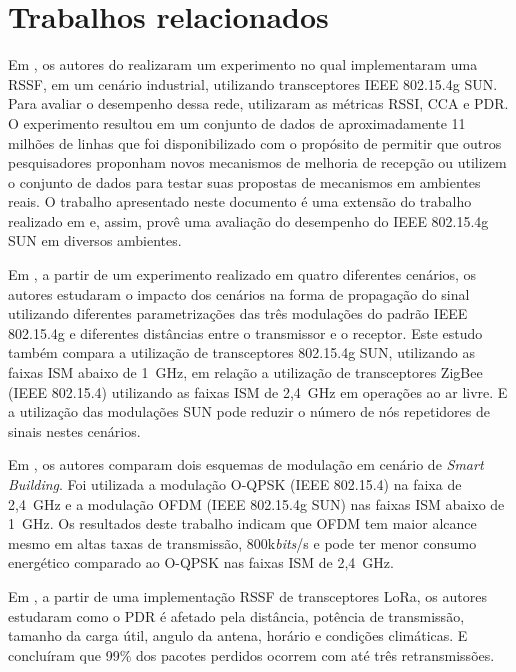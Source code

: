 \section{Trabalhos relacionados}
Em \cite{tuset2020dataset}, os autores do realizaram um experimento no qual implementaram uma RSSF, em um cenário industrial, utilizando transceptores IEEE 802.15.4g SUN. Para avaliar o desempenho dessa rede, utilizaram as métricas RSSI, CCA e PDR. O experimento resultou em um conjunto de dados de aproximadamente 11 milhões de linhas que foi disponibilizado com o propósito de permitir que outros pesquisadores proponham novos mecanismos de melhoria de recepção ou utilizem o conjunto de dados para testar suas propostas de mecanismos em ambientes reais. O trabalho apresentado neste documento é uma extensão do trabalho realizado em \cite{tuset2020dataset} e, assim, provê uma avaliação do desempenho do IEEE 802.15.4g SUN em diversos ambientes.

Em \cite{munoz2018evaluation}, a partir de um experimento realizado em quatro diferentes cenários, os autores estudaram o impacto dos cenários na forma de propagação do sinal utilizando diferentes parametrizações das três modulações do padrão IEEE 802.15.4g e diferentes distâncias entre o transmissor e o receptor. Este estudo também compara a utilização de transceptores 802.15.4g SUN, utilizando as faixas ISM abaixo de 1~GHz, em relação a utilização de transceptores ZigBee (IEEE 802.15.4) utilizando as faixas ISM de 2,4~GHz em operações ao ar livre. E a utilização das modulações SUN pode reduzir o número de nós repetidores de sinais nestes cenários.

Em  \cite{munoz2018overview}, os autores comparam dois esquemas de modulação em cenário de \emph{Smart Building}. Foi utilizada a modulação O-QPSK (IEEE 802.15.4) na faixa de 2,4~GHz e a modulação OFDM (IEEE 802.15.4g SUN) nas faixas ISM abaixo de 1~GHz. Os resultados deste trabalho indicam que OFDM tem maior alcance mesmo em altas taxas de transmissão, 800k\emph{bits}/s e pode ter menor consumo energético comparado ao O-QPSK nas faixas ISM de 2,4~GHz.

Em \cite{wang2017performance}, a partir de uma implementação RSSF de transceptores LoRa, os autores estudaram como o PDR é afetado pela distância, potência de transmissão, tamanho da carga útil, angulo da antena, horário e condições climáticas. E concluíram que 99\% dos pacotes perdidos ocorrem com até três retransmissões.
